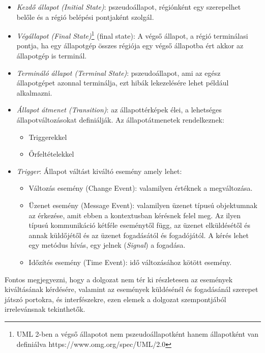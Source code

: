 \begin{itemize}
	\item \emph{Kezdő állapot (Initial State)}: pszeudoállapot, régiónként egy szerepelhet belőle és a régió belépési pontjaként szolgál.
	\item \emph{Végállapot (Final State)}\footnote{UML 2-ben a végső állapotot nem pszeudoállapotként hanem állapotként van definiálva https://www.omg.org/spec/UML/2.0} (final state): A végső állapot, a régió terminálasi pontja, ha egy állapotgép összes régiója egy végső állapotba ért akkor az állapotgép is terminál.
	\item \emph{Termináló állapot (Terminal State)}: pszeudoállapot, ami az egész állapotgépet azonnal terminálja, ezt hibák lekezelésére lehet például alkalmazni.
	\item \emph{Állapot átmenet (Transition)}: az állapottérképek élei, a lehetséges állapotváltozásokat definiálják. Az állapotátmenetek rendelkeznek:
		\begin{itemize}
			\item Triggerekkel
			\item Őrfeltételekkel
		\end{itemize}
	\item \emph{Trigger}: Állapot váltást kiváltó esemény amely lehet:
	\begin{itemize}
		\item Változás esemény (Change Event): valamilyen értéknek a megváltozása.
		\item Üzenet esemény (Message Event): valamilyen üzenet típusú objektumnak az érkezése, amit ebben a kontextusban kérésnek felel meg. Az ilyen típusú kommunikáció kétféle eseménytől függ, az üzenet elküldésétől és annak küldőjétől és az üzenet fogadásától és fogadójától. A kérés lehet egy metódus hívás, egy jelnek (\emph{Signal}) a fogadása.
		\item Időzítés esemény (Time Event): idő változásához kötött esemény.
	\end{itemize}

\end{itemize}
Fontos megjegyezni, hogy a dolgozat nem tér ki részletesen az események kiváltásának kérdésére, valamint az események küldésénél és fogadásánál szerepet játszó portokra, és interfészekre, ezen elemek a dolgozat szempontjából irrelevánsnak tekinthetők.
